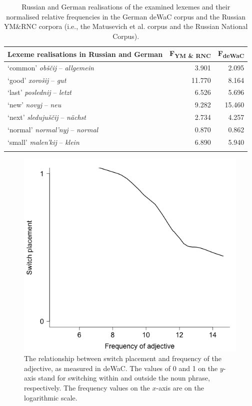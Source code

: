 \begin{table}
		\begin{tabular}{lrr}
			\lsptoprule
			Lexeme realisations in Russian and German & \multicolumn{1}{c}{F\textsubscript{YM \& RNC}} & \multicolumn{1}{c}{F\textsubscript{deWaC}} \\\midrule
			`common' \textit{obščij} -- \textit{allgemein}	&3.901	&2.095\\
			`good' \textit{xorošij} -- \textit{gut}	&11.770	&8.164\\
			`last' \textit{poslednij} -- \textit{letzt} 	&6.526	&5.696\\
			`new' \textit{novyj} -- \textit{neu}		&9.282	&15.460\\
			`next' \textit{sledujuščij} -- \textit{nächst} 	&2.734	&4.257\\
			`normal' \textit{normal'nyj} -- \textit{normal}	&0.870	&0.862\\
			`small' \textit{malen'kij} -- \textit{klein}	&6.890	&5.940\\
			\lspbottomrule
		\end{tabular}
\caption{Russian and German realisations of the examined lexemes and their normalised relative frequencies in the German deWaC corpus and the Russian YM\&RNC corpora (i.e., the Matusevich et al. corpus and the Russian National Corpus).\label{tab:4:5}}
\end{table}

\begin{figure}
	\centering
    	\includegraphics[scale=0.5]{figures/4-Fr_A_DEWAC.png}
	\caption{The relationship between switch placement and frequency of the adjective, as measured in deWaC. The values of 0 and 1 on the $y$-axis stand for switching within and outside the noun phrase, respectively. The frequency values on the $x$-axis are on the logarithmic scale.\label{fig:4:adj_de}}
\end{figure}

